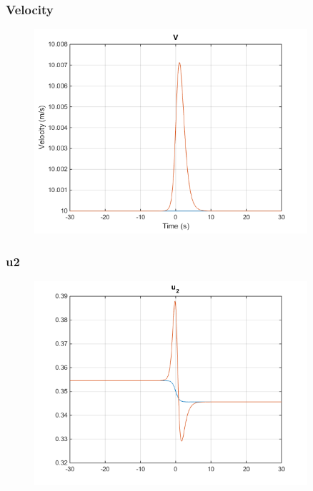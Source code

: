 \documentclass{beamer}
\begin{document}
    \begin{frame}
        \frametitle{Velocity}
        \begin{figure}
            \centering
            \includegraphics[width=0.9\textwidth]{velocity.png}
        \end{figure}
    \end{frame}
    \begin{frame}
        \frametitle{u2}
        \begin{figure}
            \centering
            \includegraphics[width=0.9\textwidth]{u2.png}
        \end{figure}
    \end{frame}
\end{document}
